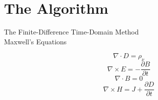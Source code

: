 \section{The Algorithm}

The Finite-Difference Time-Domain Method\\
Maxwell's Equations

\begin{displaymath}
  \nabla \cdot D = \rho_{\nu}
\end{displaymath}
\begin{displaymath}
    \nabla \times E = -\frac{\partial B}{\partial t}
\end{displaymath}
\begin{displaymath}
  \nabla \cdot B = 0
\end{displaymath}
\begin{displaymath}
  \nabla \times H = J + \frac{\partial D}{\partial t}
\end{displaymath}



